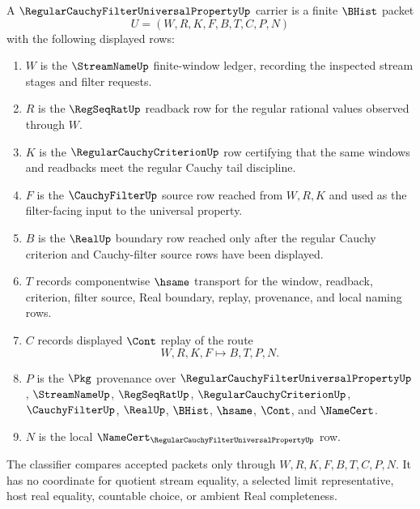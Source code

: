 \begin{definition}
\label{def:regular-cauchy-filter-universal-property-carrier}
A $\RegularCauchyFilterUniversalPropertyUp$ carrier is a finite $\BHist$ packet
$$
U=(W,R,K,F,B,T,C,P,N)
$$
with the following displayed rows:
\begin{enumerate}
\item $W$ is the $\StreamNameUp$ finite-window ledger, recording the inspected stream stages and filter requests.
\item $R$ is the $\RegSeqRatUp$ readback row for the regular rational values observed through $W$.
\item $K$ is the $\RegularCauchyCriterionUp$ row certifying that the same windows and readbacks meet the regular Cauchy tail discipline.
\item $F$ is the $\CauchyFilterUp$ source row reached from $W,R,K$ and used as the filter-facing input to the universal property.
\item $B$ is the $\RealUp$ boundary row reached only after the regular Cauchy criterion and Cauchy-filter source rows have been displayed.
\item $T$ records componentwise $\hsame$ transport for the window, readback, criterion, filter source, Real boundary, replay, provenance, and local naming rows.
\item $C$ records displayed $\Cont$ replay of the route
$$
W,R,K,F \longmapsto B,T,P,N .
$$
\item $P$ is the $\Pkg$ provenance over $\RegularCauchyFilterUniversalPropertyUp$, $\StreamNameUp$, $\RegSeqRatUp$, $\RegularCauchyCriterionUp$, $\CauchyFilterUp$, $\RealUp$, $\BHist$, $\hsame$, $\Cont$, and $\NameCert$.
\item $N$ is the local $\NameCert_{\RegularCauchyFilterUniversalPropertyUp}$ row.
\end{enumerate}
The classifier compares accepted packets only through $W,R,K,F,B,T,C,P,N$. It has no coordinate for quotient stream equality, a selected limit representative, host real equality, countable choice, or ambient Real completeness.
\end{definition}

